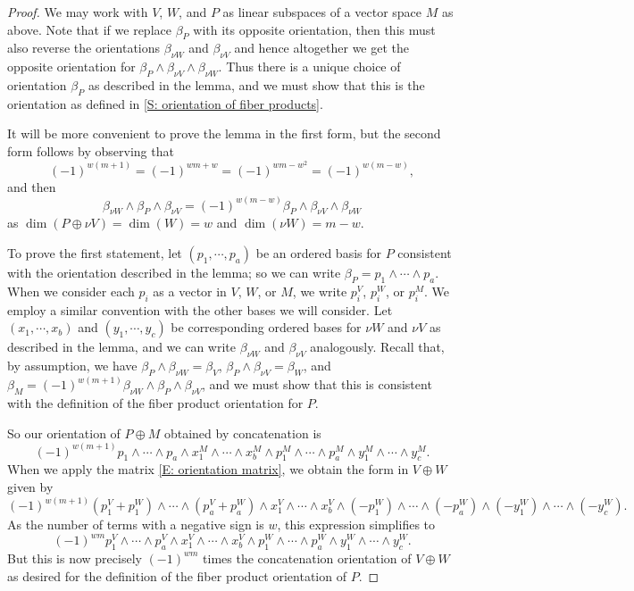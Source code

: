 \begin{proof}
	We may work with $V$, $W$, and $P$ as linear subspaces of a vector space $M$ as above. Note that if we replace $\beta_P$ with its opposite orientation, then this must also reverse the orientations $\beta_{\nu W}$ and $\beta_{\nu V}$ and hence altogether we get the opposite orientation for $\beta_P \wedge \beta_{\nu V} \wedge \beta_{\nu W}$.
	Thus there is a unique choice of orientation $\beta_P$ as described in the lemma, and we must show that this is the orientation as defined in \cref{S: orientation of fiber products}.

	It will be more convenient to prove the lemma in the first form, but the second form follows by observing that $$(-1)^{w(m+1)} = (-1)^{wm+w} = (-1)^{wm-w^2} = (-1)^{w(m-w)},$$
	and then
	$$\beta_{\nu W} \wedge \beta_P \wedge \beta_{\nu V} = (-1)^{w(m-w)} \beta_P \wedge \beta_{\nu V} \wedge \beta_{\nu W}$$
	as $\dim(P \oplus \nu V) = \dim(W) = w$ and $\dim(\nu W) = m-w$.

	To prove the first statement, let $(p_1,\cdots,p_a)$ be an ordered basis for $P$ consistent with the orientation described in the lemma; so we can write $\beta_P = p_1 \wedge\cdots\wedge p_a$.
	When we consider each $p_i$ as a vector in $V$, $W$, or $M$, we write $p_i^V$, $p_i^W$, or $p_i^M$.
	We employ a similar convention with the other bases we will consider.
	Let $(x_1,\cdots,x_b)$ and $(y_1,\cdots,y_c)$ be corresponding ordered bases for $\nu W$ and $\nu V$ as described in the lemma, and we can write $\beta_{\nu W}$ and $\beta_{\nu V}$ analogously. Recall that, by assumption, we have $\beta_P \wedge \beta_{\nu W} = \beta_V$, $\beta_P \wedge \beta_{\nu V} = \beta_W$, and $\beta_M = (-1)^{w(m+1)} \beta_{\nu W} \wedge \beta_P \wedge \beta_{\nu V}$, and we must show that this is consistent with the definition of the fiber product orientation for $P$.
	
	So our orientation of $P \oplus M$ obtained by concatenation is
	$$(-1)^{w(m+1)} p_1 \wedge\cdots\wedge p_a \wedge x^M_1 \wedge\cdots\wedge x^M_b \wedge p^M_1 \wedge\cdots\wedge p^M_a \wedge y^M_1 \wedge\cdots\wedge y^M_c.$$
	When we apply the matrix \eqref{E: orientation matrix}, we obtain the form in $V \oplus W$ given by
	$$(-1)^{w(m+1)} (p^V_1+p^W_1) \wedge\cdots\wedge (p^V_a+p^W_a) \wedge x^V_1 \wedge\cdots\wedge x^V_b \wedge (- p^W_1) \wedge\cdots\wedge (-p^W_a) \wedge (-y^W_1) \wedge\cdots\wedge(- y^W_c).$$
	As the number of terms with a negative sign is $w$, this expression simplifies to
	$$(-1)^{wm} p^V_1 \wedge\cdots\wedge p^V_a \wedge x^V_1 \wedge\cdots\wedge x^V_b \wedge p^W_1 \wedge\cdots\wedge p^W_a \wedge y^W_1 \wedge\cdots\wedge y^W_c.$$
	But this is now precisely $(-1)^{wm}$ times the concatenation orientation of $V \oplus W$ as desired for the definition of the fiber product orientation of $P$.
\end{proof}

